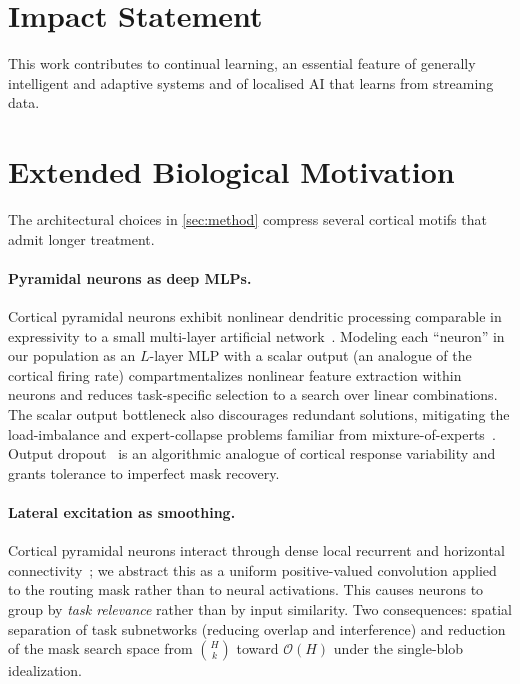 \documentclass{article}
\theoremstyle{plain}
\theoremstyle{remark}
\begin{document}
\section*{Impact Statement}

This work contributes to continual learning, an essential feature of generally intelligent and adaptive systems and of localised AI that learns from streaming data.




\newpage
\appendix
\onecolumn

\section{Extended Biological Motivation}
\label{app:bio}
The architectural choices in \cref{sec:method} compress several cortical motifs that admit longer treatment.

\paragraph{Pyramidal neurons as deep MLPs.}
Cortical pyramidal neurons exhibit nonlinear dendritic processing comparable in expressivity to a small multi-layer artificial network~\citep{poirazi2003pyramidal,poirazi2020illuminating,beniaguev2021single}. Modeling each ``neuron'' in our population as an $L$-layer MLP with a scalar output (an analogue of the cortical firing rate) compartmentalizes nonlinear feature extraction within neurons and reduces task-specific selection to a search over linear combinations. The scalar output bottleneck also discourages redundant solutions, mitigating the load-imbalance and expert-collapse problems familiar from mixture-of-experts~\citep{shazeer2017outrageously,fedus2022switch}. Output dropout~\citep{srivastava2014dropout} is an algorithmic analogue of cortical response variability and grants tolerance to imperfect mask recovery.

\paragraph{Lateral excitation as smoothing.}
Cortical pyramidal neurons interact through dense local recurrent and horizontal connectivity~\citep{hubel1962receptive,gilbert1983clustered,douglas2004neuronal}; we abstract this as a uniform positive-valued convolution applied to the routing mask rather than to neural activations. This causes neurons to group by \emph{task relevance} rather than by input similarity. Two consequences: spatial separation of task subnetworks (reducing overlap and interference) and reduction of the mask search space from $\binom{H}{k}$ toward $\mathcal{O}(H)$ under the single-blob idealization.
\end{document}

